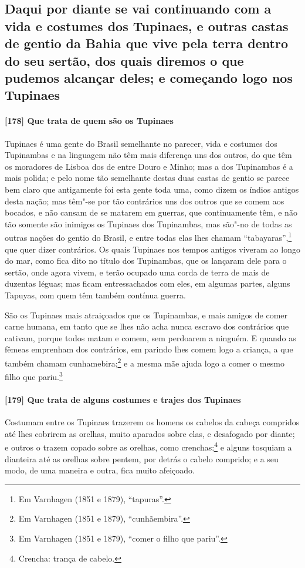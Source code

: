 \begin{linenumbers}
\subsection{Daqui por diante se vai continuando com a vida e costumes dos Tupinaes, e
outras castas de gentio da Bahia que vive pela terra dentro do seu sertão, dos quais
diremos o que pudemos alcançar deles; e começando logo nos Tupinaes}

\paragraph{[178] Que trata de quem são os Tupinaes}\quad
Tupinaes é uma gente do Brasil semelhante no parecer, vida e costumes dos Tupinambas e na
linguagem não têm mais diferença uns dos outros, do que têm os moradores de Lisboa dos
de entre Douro e Minho; mas a dos Tupinambas é a mais polida; e pelo nome tão semelhante
destas duas castas de gentio se parece bem claro que antigamente foi esta gente toda uma,
como dizem os índios antigos desta nação; mas têm"-se por tão contrários uns dos outros que
se comem aos bocados, e não cansam de se matarem em guerras, que continuamente têm, e não
tão somente são inimigos os Tupinaes dos Tupinambas, mas são"-no de todas as outras nações
do gentio do Brasil, e entre todas elas lhes chamam ``tabayaras'',\footnote{ Em Varnhagen
(1851 e 1879), ``tapuras''.} que quer dizer contrários. Os quais Tupinaes nos tempos
antigos viveram ao longo do mar, como fica dito no título dos Tupinambas, que os lançaram
dele para o sertão, onde agora vivem, e terão ocupado uma corda de terra de mais de
duzentas léguas; mas ficam entressachados com eles, em algumas partes, alguns Tapuyas, com
quem têm também contínua guerra.

São os Tupinaes mais atraiçoados que os Tupinambas, e mais amigos de comer carne humana,
em tanto que se lhes não acha nunca escravo dos contrários que cativam, porque todos matam
e comem, sem perdoarem a ninguém. E quando as fêmeas emprenham dos contrários, em parindo
lhes comem logo a criança, a que também chamam cunhamebira;\footnote{ Em Varnhagen (1851 e
1879), ``cunhãembira''.} e a mesma mãe ajuda logo a comer o mesmo filho que
pariu.\footnote{ Em Varnhagen (1851 e 1879), ``comer o filho que pariu''.}

\paragraph{[179] Que trata de alguns costumes e trajes dos Tupinaes}\quad
\mbox{Costumam} entre os Tupinaes trazerem os homens os cabelos da cabeça compridos até lhes
cobrirem as orelhas, muito aparados sobre elas, e desafogado por diante; e outros o trazem
copado sobre as orelhas, como crenchas;\footnote{ Crencha: trança de cabelo.} e alguns
tosquiam a dianteira até as orelhas sobre pentem, por detrás o cabelo comprido; e a seu
modo, de uma maneira e outra, fica muito afeiçoado.


\end{linenumbers}

